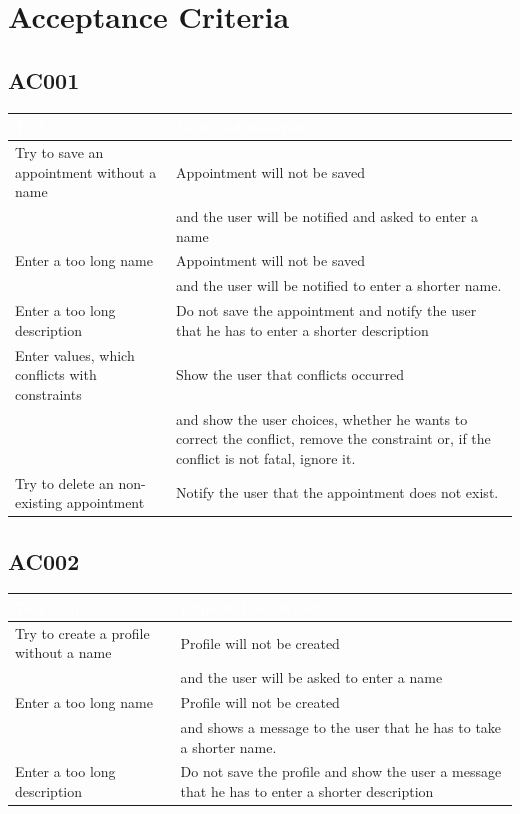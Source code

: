 \documentclass[12pt]{scrartcl}
\begin{document}

    \section{Acceptance Criteria}                               %

    \subsection{AC001}
        \begin{tabular}{|L{8cm}|L{8cm}|}
            \hline 
            \textcolor{white}{Test step} & \textcolor{white}{Expected behaviour} \\ \hline
            Try to save an appointment without a name & Appointment will not be saved\\ 
            & and the user will be notified and asked to enter a name \\ \hline
            Enter a too long name & Appointment will not be saved\\
            &and the user will be notified to enter a shorter name.\\ \hline
            Enter a too long description & Do not save the appointment and notify the user that he has to enter a shorter description \\ \hline
            Enter values, which conflicts with constraints & Show the user that conflicts occurred \\
            & and show the user choices, whether he wants to correct the conflict, remove the constraint or, if the conflict is not fatal, ignore it.\\ \hline
            Try to delete an non-existing appointment & Notify the user that the appointment does not exist. \\ \hline 
        \end{tabular}
    \subsection{AC002}
        \begin{tabular}{|L{8cm}|L{8cm}|} 
            \hline 
            \textcolor{white}{Test step} & \textcolor{white}{Expected behaviour} \\ \hline
            Try to create a profile without a name& Profile will not be created\\ 
            & and the user will be asked to enter a name\\ \hline
            Enter a too long name & Profile will not be created\\
            &and shows a message to the user that he has to take a shorter name. \\ \hline
            Enter a too long description & Do not save the profile and show the user a message that he has to enter a shorter description \\ \hline
        \end{tabular}
\end{document}
